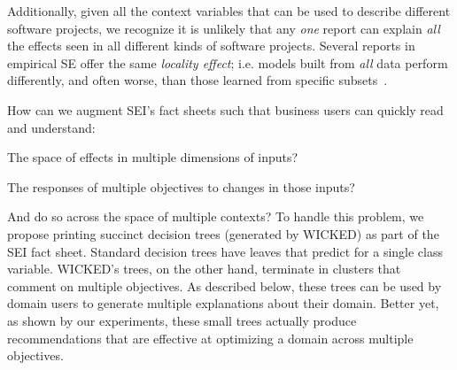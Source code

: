  
Additionally, given all the context variables that can be used to describe different
software projects, we recognize it is unlikely that any 
{\em one} report can explain {\em all} the effects
seen in all different kinds of software projects. Several reports in empirical
SE offer the same {\em locality effect}; i.e. models built from  {\em all}  data perform
differently, and often worse, than those learned from specific subsets~\cite{posnet11,betta12,me12d,yang13,emse12}.


How can we augment SEI's fact sheets such that business users can quickly read and understand:
\bi
\item
The space of effects in multiple dimensions of inputs?
\item
The responses of multiple objectives to changes in those inputs?
\item
And do so across the space of multiple contexts?
\ei
To handle this problem,
we propose printing succinct decision trees (generated by WICKED)
as part of the SEI fact sheet. Standard decision trees have leaves
that predict for a single class variable. WICKED's trees, on the other hand,
terminate in clusters that comment on multiple objectives. 
As described below, these trees can be used by domain users to generate
multiple explanations about their domain. Better yet, as shown by our experiments,
these small trees actually produce recommendations that are effective at optimizing
a domain across multiple objectives.
